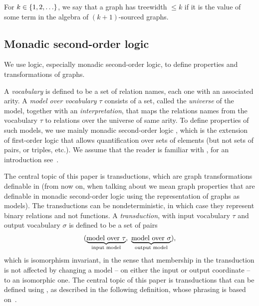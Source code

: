   \begin{definition}[Treewidth]
        For $k \in \{1,2,\ldots\}$, we say that a  graph has treewidth  $\le  k$ if it is the value of some term in the algebra of $(k+1)$-sourced graphs.
    \end{definition}

  
    

    \subsection{Monadic second-order logic}
    We  use logic, especially monadic second-order logic, to define properties and transformations of graphs. 

    A  \emph{vocabulary} is defined to be  a set of relation names, each one with an associated arity. A \emph{model over vocabulary $\tau$} consists of a set, called the \emph{universe} of the model, together with an \emph{interpretation}, that maps the relations names from the vocabulary $\tau$ to  relations over the universe of same arity. To define properties of such models, we use mainly monadic second-order logic \mso, which  is the extension of first-order logic that allows quantification over sets of elements (but not sets of pairs, or triples, etc.). We assume that the reader is familiar with \mso, for an introduction see~\cite[Section 2]{Thomas97}.
     
     
 The central topic of this paper is \mso transductions, which are graph transformations definable in \mso (from now on, when talking about \mso we mean graph properties that are definable in monadic second-order logic using the \msotwo representation of graphs as models). The transductions can be nondeterministic, in which case they represent binary relations and not functions.
A \emph{transduction}, with input vocabulary $\tau$ and output vocabulary $\sigma$ is defined to be a set of pairs 
\begin{align*}
    (\myunderbrace{\text{model over $\tau$}}{input model}, \ 
    \myunderbrace{\text{model over $\sigma$}}{output model}),
\end{align*}
which is isomorphism invariant, in the sense that membership in the transduction is not affected by changing a model -- on either the input or output coordinate -- to an isomorphic one. The central topic of this paper is transductions that can be defined using \mso, as described in the following definition, whose phrasing is based on~\cite[p.~9--10]{bojanczykOptimizingTreeDecompositions2017a}. 

